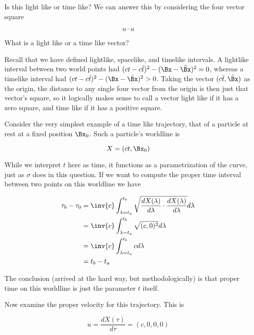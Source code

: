 Is this light like or time like?  We can answer this by considering the four vector square

\begin{equation}\label{eqn:relativisticElectrodynamicsT2:80}
u \cdot u 
\end{equation}

What is a light like or a time like vector?

Recall that we have defined lightlike, spacelike, and timelike intervals.  A lightlike interval between two world points had $(ct - c\tilde{t})^2 - (\Bx -\tilde{\Bx})^2 = 0$, whereas a timelike interval had $(ct - c\tilde{t})^2 - (\Bx -\tilde{\Bx})^2 > 0$.  Taking the vector $(c \tilde{t}, \tilde{\Bx})$ as the origin, the distance to any single four vector from the origin is then just that vector's square, so it logically makes sense to call a vector light like if it has a zero square, and time like if it has a positive square.

Consider the very simplest example of a time like trajectory, that of a particle at rest at a fixed position $\Bx_0$.  Such a particle's worldline is

\begin{equation}\label{eqn:relativisticElectrodynamicsT2:71}
X = ( c t, \Bx_0 )
\end{equation}

While we interpret $t$ here as time, it functions as a parametrization of the curve, just as $\sigma$ does in this question.  If we want to compute the proper time interval between two points on this worldline we have

\begin{align*}
\tau_b - \tau_0 
&=
\inv{c} \int_{\lambda = t_a}^{t_b} \sqrt{ \frac{dX(\lambda)}{d\lambda} \cdot \frac{dX(\lambda)}{d\lambda} } d\lambda \\
&=
\inv{c} \int_{\lambda = t_a}^{t_b} \sqrt{ (c, 0)^2 } d\lambda \\
&=
\inv{c} \int_{\lambda = t_a}^{t_b} c d\lambda \\
&= t_b - t_a
\end{align*}

The conclusion (arrived at the hard way, but methodologically) is that proper time on this worldline is just the parameter $t$ itself.

Now examine the proper velocity for this trajectory.  This is

\begin{equation}\label{eqn:relativisticElectrodynamicsT2:72}
u = \frac{dX(\tau)}{d\tau} = (c, 0, 0, 0)
\end{equation}

